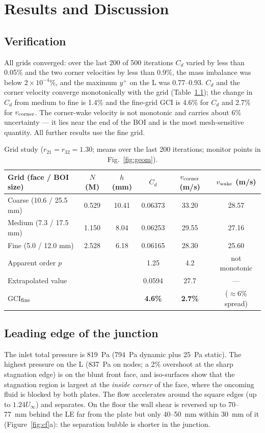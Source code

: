 \documentclass[12pt]{iitdamthes}
\begin{document}
\chapter{Results and Discussion}

\section{Verification}
All grids converged: over the last 200 of 500 iterations $C_d$ varied by less than 0.05\% and the two
corner velocities by less than 0.9\%, the mass imbalance was below $2\times10^{-4}$\%, and the maximum
$y^+$ on the L was 0.77--0.93. $C_d$ and the corner velocity converge monotonically with the grid
(Table~\ref{tab:gci}); the change in $C_d$ from medium to fine is 1.4\% and the fine-grid GCI is
4.6\% for $C_d$ and 2.7\% for $v_{\rm corner}$. The corner-wake velocity is not monotonic and carries
about 6\% uncertainty --- it lies near the end of the BOI and is the most mesh-sensitive quantity.
All further results use the fine grid.

\begin{table}[t]
\centering
\small
\begin{tabular}{@{}lccccc@{}}
\toprule
Grid (face / BOI size) & $N$ (M) & $h$ (mm) & $C_d$ & $v_{\rm corner}$ (m/s) & $v_{\rm wake}$ (m/s)\\
\midrule
Coarse (10.6 / 25.5 mm) & 0.529 & 10.41 & 0.06373 & 33.20 & 28.57\\
Medium (7.3 / 17.5 mm) & 1.150 & 8.04 & 0.06253 & 29.55 & 27.16\\
Fine (5.0 / 12.0 mm) & 2.528 & 6.18 & 0.06165 & 28.30 & 25.60\\
\midrule
Apparent order $p$ & & & 1.25 & 4.2 & not monotonic\\
Extrapolated value & & & 0.0594 & 27.7 & ---\\
GCI$_{\rm fine}$ & & & \textbf{4.6\%} & \textbf{2.7\%} & ($\approx$6\% spread)\\
\bottomrule
\end{tabular}
\caption{Grid study ($r_{21}=r_{32}=1.30$; means over the last 200 iterations; monitor points in
Fig.~\ref{fig:geom}).}
\label{tab:gci}
\end{table}

\section{Leading edge of the junction}
The inlet total pressure is 819~Pa (794~Pa dynamic plus 25~Pa static). The highest pressure on the L
(837~Pa on nodes; a 2\% overshoot at the sharp stagnation edge) is on the blunt front face, and
iso-surfaces show that the stagnation region is largest at the \emph{inside corner} of the face,
where the oncoming fluid is blocked by both plates. The flow accelerates around the square edges (up
to $1.24U_\infty$) and separates. On the floor the wall shear is reversed up to 70--77~mm behind the
LE far from the plate but only 40--50~mm within 30~mm of it (Figure~\ref{fig:cf}a): the separation
bubble is shorter in the junction.
\end{document}

